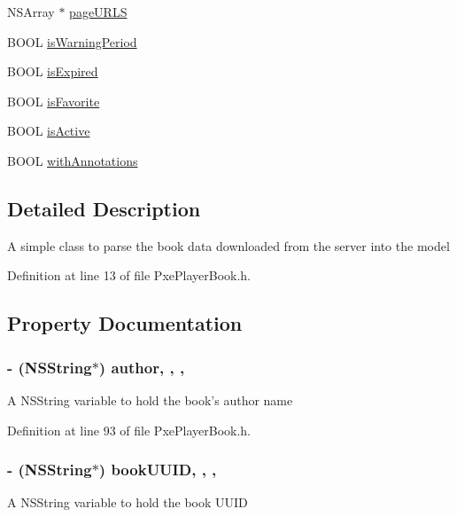 \begin{DoxyCompactItemize}
\item 
N\-S\-Array $\ast$ \hyperlink{interface_pxe_player_book_a36d7ed8749aa6ab03a805aed527811aa}{page\-U\-R\-L\-S}
\item 
B\-O\-O\-L \hyperlink{interface_pxe_player_book_a540dc3b69e8d585b9fdb4c344609d9c7}{is\-Warning\-Period}
\item 
B\-O\-O\-L \hyperlink{interface_pxe_player_book_af6b425654a214e8d5cdc4bd3be2a4203}{is\-Expired}
\item 
B\-O\-O\-L \hyperlink{interface_pxe_player_book_a9e8503084ff1fe4c3f501be74cce61a5}{is\-Favorite}
\item 
B\-O\-O\-L \hyperlink{interface_pxe_player_book_a925ea189e97b526295cecdc85f13279b}{is\-Active}
\item 
B\-O\-O\-L \hyperlink{interface_pxe_player_book_a1c5d347398ddb5ab9b4b5b0a322f1d40}{with\-Annotations}
\end{DoxyCompactItemize}


\subsection{Detailed Description}
A simple class to parse the book data downloaded from the server into the model 

Definition at line 13 of file Pxe\-Player\-Book.\-h.



\subsection{Property Documentation}
\hypertarget{interface_pxe_player_book_a1ddad2064600a6239eb5dc4e007d2e7c}{
\subsubsection[{author}]{\setlength{\rightskip}{0pt plus 5cm}-\/ (N\-S\-String$\ast$) author\hspace{0.3cm}{\ttfamily [read]}, {\ttfamily [write]}, {\ttfamily [nonatomic]}, {\ttfamily [strong]}}}\label{interface_pxe_player_book_a1ddad2064600a6239eb5dc4e007d2e7c}
A N\-S\-String variable to hold the book's author name 

Definition at line 93 of file Pxe\-Player\-Book.\-h.

\hypertarget{interface_pxe_player_book_aebb4a95ecf0dd74f70abe6c234171d4b}{
\subsubsection[{book\-U\-U\-I\-D}]{\setlength{\rightskip}{0pt plus 5cm}-\/ (N\-S\-String$\ast$) book\-U\-U\-I\-D\hspace{0.3cm}{\ttfamily [read]}, {\ttfamily [write]}, {\ttfamily [nonatomic]}, {\ttfamily [strong]}}}\label{interface_pxe_player_book_aebb4a95ecf0dd74f70abe6c234171d4b}
A N\-S\-String variable to hold the book U\-U\-I\-D 


